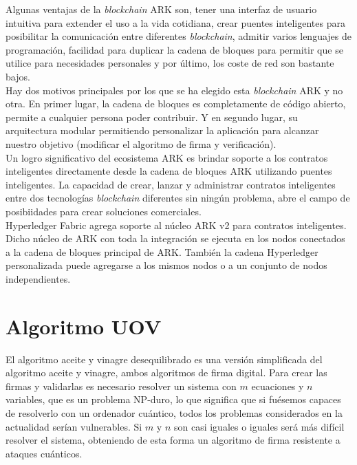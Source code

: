 Algunas ventajas de la \textit{blockchain} ARK son, tener una interfaz de usuario intuitiva para extender el uso a la vida cotidiana, crear puentes inteligentes para posibilitar la comunicación entre diferentes \textit{blockchain}, admitir varios lenguajes de programación, facilidad para duplicar la cadena de bloques para permitir que se utilice para necesidades personales y por último, los coste de red son bastante bajos\cite{ark-pros}.\\

Hay dos motivos principales por los que se ha elegido esta \textit{blockchain} ARK y no otra. En primer lugar, la cadena de bloques es completamente de código abierto, permite a cualquier persona poder contribuir. Y en segundo lugar, su arquitectura modular permitiendo personalizar la aplicación para alcanzar nuestro objetivo (modificar el algoritmo de firma y verificación).\\


Un logro significativo del ecosistema ARK es brindar soporte a los contratos inteligentes directamente desde la cadena de bloques ARK utilizando puentes inteligentes. La capacidad de crear, lanzar y administrar contratos inteligentes entre dos tecnologías \textit{blockchain} diferentes sin ningún problema, abre el campo de posibiidades para crear soluciones comerciales.\\

Hyperledger Fabric agrega soporte al núcleo ARK v2 para contratos inteligentes. Dicho núcleo de ARK con toda la integración se ejecuta en los nodos conectados a la cadena de bloques principal de ARK. También la cadena Hyperledger personalizada puede agregarse a los mismos nodos o a un conjunto de nodos independientes\cite{hyperledger-ark}.\\



\section{Algoritmo UOV}\label{sec:intro:UOV}

El algoritmo aceite y vinagre desequilibrado\cite{algoritmo-UOV} es una versión simplificada del algoritmo aceite y vinagre, ambos algoritmos de firma digital. Para crear las firmas y validarlas es necesario resolver un sistema con $m$ ecuaciones y $n$ variables, que es un problema NP-duro\cite{UOV-def}, lo que significa que si fuésemos capaces de resolverlo con un ordenador cuántico, todos los problemas considerados en la actualidad serían vulnerables. Si $m$ y $n$ son casi iguales o iguales será más difícil resolver el sistema, obteniendo de esta forma un algoritmo de firma resistente a ataques cuánticos.\\

